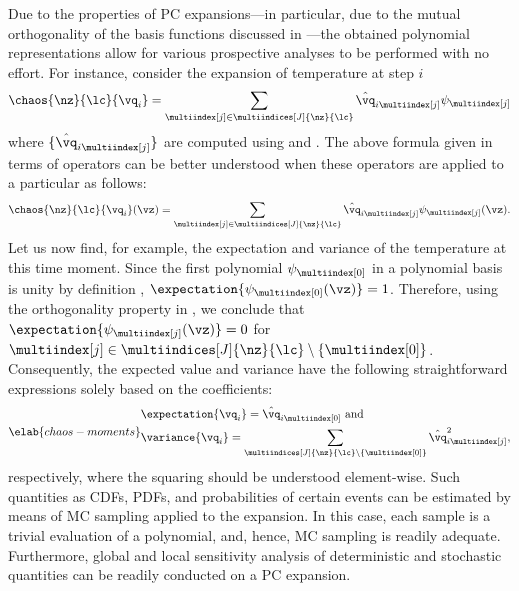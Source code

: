 Due to the properties of \ac{PC} expansions---in particular, due to the mutual
orthogonality of the basis functions discussed in ---the
obtained polynomial representations allow for various prospective analyses to be
performed with no effort. For instance, consider the expansion of temperature at
step $i$
\[
  \chaos{\nz}{\lc}{\vq_i} = \sum_{\multiindex[j] \in \multiindices[J]{\nz}{\lc}} \hat{\vq}_{i \multiindex[j]} \psi_{\multiindex[j]}
\]
where $\{ \hat{\vq}_{i \multiindex[j]} \}$ are computed using
 and . The above formula
given in terms of operators can be better understood when these operators are
applied to a particular \vz as follows:
\[
  \chaos{\nz}{\lc}{\vq_i}(\vz) = \sum_{\multiindex[j] \in \multiindices[J]{\nz}{\lc}} \hat{\vq}_{i \multiindex[j]} \psi_{\multiindex[j]}(\vz).
\]
Let us now find, for example, the expectation and variance of the temperature at
this time moment. Since the first polynomial $\psi_{\multiindex[0]}$ in a
polynomial basis is unity by definition \cite{xiu2010},
$\expectation{\psi_{\multiindex[0]}(\vz)} = 1$. Therefore, using the
orthogonality property in , we conclude that
$\expectation{\psi_{\multiindex[j]}(\vz)} = 0$ for $\multiindex[j] \in
\multiindices[J]{\nz}{\lc} \setminus \{ \multiindex[0] \}$. Consequently, the
expected value and variance have the following straightforward expressions
solely based on the coefficients:
\begin{equation} \elab{chaos-moments}
  \begin{split}
    & \expectation{\vq_i} = \hat{\vq}_{i \multiindex[0]} \text{ and} \\
    & \variance{\vq_i} = \sum_{\multiindices[J]{\nz}{\lc} \setminus \{ \multiindex[0] \}} \hat{\vq}_{i \multiindex[j]}^2,
  \end{split}
\end{equation}
respectively, where the squaring should be understood element-wise. Such
quantities as \acp{CDF}, \acp{PDF}, and probabilities of certain events can be
estimated by means of \ac{MC} sampling applied to the expansion. In this case,
each sample is a trivial evaluation of a polynomial, and, hence, \ac{MC}
sampling is readily adequate. Furthermore, global and local sensitivity analysis
of deterministic and stochastic quantities can be readily conducted on a \ac{PC}
expansion.
